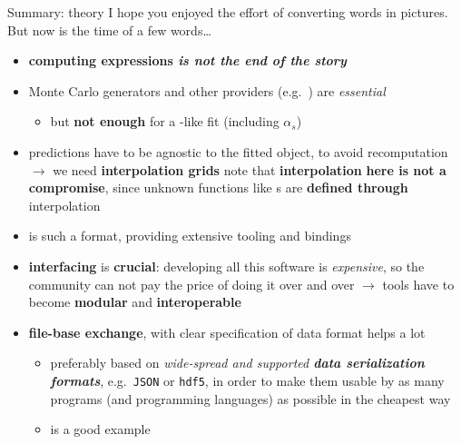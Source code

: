 \documentclass[9pt]{beamer}
\begin{document}
\begin{frame}{Summary: theory}
    I hope you enjoyed the effort of converting words in pictures. But now is
    the time of a few words\dots
    \vspace*{10pt}

    \begin{itemize}
        \item \textbf{computing expressions \alert{\textit{is not the end of
            the story}}}
        \item Monte Carlo generators and other providers (e.g.\ \yadism{}) are \textit{essential}
        \begin{itemize}
            \item but \textbf{not enough} for a \pdf{}-like fit (including $\alpha_s$)
        \end{itemize}
        \item predictions have to be agnostic to the fitted object, to avoid
            recomputation $\to$ we need \alert{\textbf{interpolation grids}}
            {\footnotesize note that \textbf{interpolation} \textbf{here is not
            a compromise}, since unknown functions like \pdf{}s are
            \textbf{defined through} interpolation}
        \item \pineappl is such a format, providing extensive tooling and bindings
        \item \textbf{\alert{interfacing}} is \textbf{crucial}:
            developing all this software is \textit{expensive}, so the
            community can not pay the price of doing it over and over $\to$
            tools have to become \textbf{modular} and \textbf{interoperable}
        \item \textbf{\alert{file}-base exchange}, with clear specification of
            data format helps a lot
        \begin{itemize}
            \item preferably based on \textit{wide-spread and supported \textbf{data
                serialization formats}}, e.g.\ \texttt{JSON} or \texttt{hdf5}, in
                order to make them usable by as many programs (and programming
                languages) as possible in the cheapest way
            \item \lhapdf is a good example
        \end{itemize}
    \end{itemize}
\end{frame}
\end{document}
